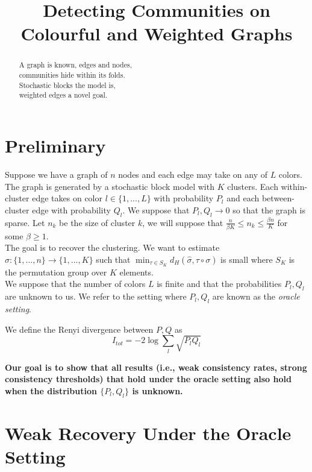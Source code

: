 \documentclass{article}
\begin{document}
\title{Detecting Communities on Colourful and Weighted Graphs}
\maketitle

\begin{abstract}
\centering
\noindent 
A graph is known, edges and nodes, \\
communities hide within its folds. \\
Stochastic blocks the model is, \\
weighted edges a novel goal.
\end{abstract}

\tableofcontents


\newpage
\section{Preliminary}

Suppose we have a graph of $n$ nodes and each edge may take on any of $L$ colors. The graph is generated by a stochastic block model with $K$ clusters. Each within-cluster edge takes on color $l \in \{1,...,L\}$ with probability $P_l$ and each between-cluster edge with probability $Q_l$. We suppose that $P_l, Q_l \rightarrow 0$ so that the graph is sparse. Let $n_k$ be the size of cluster $k$, we will suppose that $\frac{n}{\beta K} \leq n_k \leq \frac{\beta n}{K}$ for some $\beta \geq 1$. \\

The goal is to recover the clustering. We want to estimate $\hat{\sigma} : \{1,...,n\} \rightarrow \{1,...,K\}$ such that $\min_{\tau \in S_K} d_H( \hat{\sigma}, \tau \circ \sigma)$ is small where $S_K$ is the permutation group over $K$ elements.\\

We suppose that the number of colors $L$ is finite and that the probabilities $P_l, Q_l$ are unknown to us. We refer to the setting where $P_l, Q_l$ are known as the \emph{oracle setting}. 

We define the Renyi divergence between $P,Q$ as
\[
I_{tot} = -2 \log \sum_l \sqrt{P_l Q_l}
\]

\textbf{Our goal is to show that all results (i.e., weak consistency rates, strong consistency thresholds) that hold under the oracle setting also hold when the distribution $\{P_l, Q_l\}$ is unknown. }

\section{Weak Recovery Under the Oracle Setting}
\end{document}
